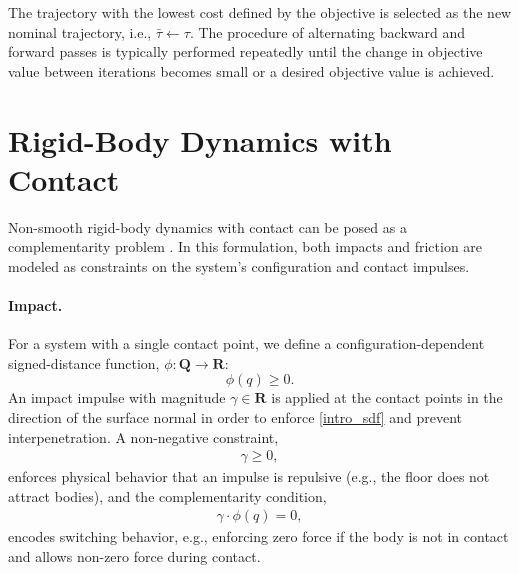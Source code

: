 The trajectory with the lowest cost defined by the objective is selected as the new nominal trajectory, i.e., $\bar{\tau} \leftarrow \tau$. The procedure of alternating backward and forward passes is typically performed repeatedly until the change in objective value between iterations becomes small or a desired objective value is achieved.

\section{Rigid-Body Dynamics with Contact}
Non-smooth rigid-body dynamics with contact can be posed as a complementarity problem \cite{stewart1996implicit}. In this formulation, both impacts and friction are modeled as constraints on the system's configuration and contact impulses.

\paragraph{Impact.} For a system with a single contact point, we define a configuration-dependent signed-distance function, $\phi : \mathbf{Q} \rightarrow \mathbf{R}$:
\begin{equation} 
	\phi(q) \geq 0. \label{intro_sdf}
\end{equation}
An impact impulse with magnitude $\gamma \in \mathbf{R}$ is applied at the contact points in the direction of the surface normal in order to enforce \eqref{intro_sdf} and prevent interpenetration. A non-negative constraint, 
\begin{align}
	\gamma \geq 0, \label{intro_impact_inequality}
\end{align}
enforces physical behavior that an impulse is repulsive (e.g., the floor does not attract bodies), and the complementarity condition,
\begin{align}
	\gamma \cdot \phi(q) = 0, \label{intro_impact_complementarity}
\end{align}
encodes switching behavior, e.g., enforcing zero force if the body is not in contact and allows non-zero force during contact.

